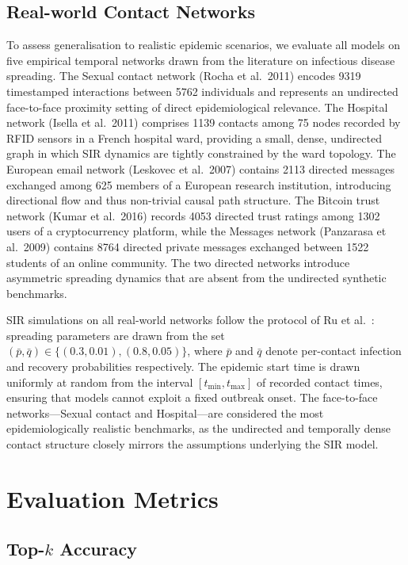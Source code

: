 \subsection{Real-world Contact Networks}
\label{ssst:realworld}

To assess generalisation to realistic epidemic scenarios, we evaluate all models on five empirical temporal networks drawn from the literature on infectious disease spreading. The Sexual contact network (Rocha et al.\ 2011) encodes 9319 timestamped interactions between 5762 individuals and represents an undirected face-to-face proximity setting of direct epidemiological relevance. The Hospital network (Isella et al.\ 2011) comprises 1139 contacts among 75 nodes recorded by RFID sensors in a French hospital ward, providing a small, dense, undirected graph in which SIR dynamics are tightly constrained by the ward topology. The European email network (Leskovec et al.\ 2007) contains 2113 directed messages exchanged among 625 members of a European research institution, introducing directional flow and thus non-trivial causal path structure. The Bitcoin trust network (Kumar et al.\ 2016) records 4053 directed trust ratings among 1302 users of a cryptocurrency platform, while the Messages network (Panzarasa et al.\ 2009) contains 8764 directed private messages exchanged between 1522 students of an online community. The two directed networks introduce asymmetric spreading dynamics that are absent from the undirected synthetic benchmarks.

SIR simulations on all real-world networks follow the protocol of Ru et al.~\cite{Ru2023}: spreading parameters are drawn from the set $(\bar{p}, \bar{q}) \in \{(0.3, 0.01), (0.8, 0.05)\}$, where $\bar{p}$ and $\bar{q}$ denote per-contact infection and recovery probabilities respectively. The epidemic start time is drawn uniformly at random from the interval $[t_{\min}, t_{\max}]$ of recorded contact times, ensuring that models cannot exploit a fixed outbreak onset. The face-to-face networks---Sexual contact and Hospital---are considered the most epidemiologically realistic benchmarks, as the undirected and temporally dense contact structure closely mirrors the assumptions underlying the SIR model.

\section{Evaluation Metrics}
\label{st:evalmetrics}

\subsection{Top-$k$ Accuracy}
\label{ssst:topk}

